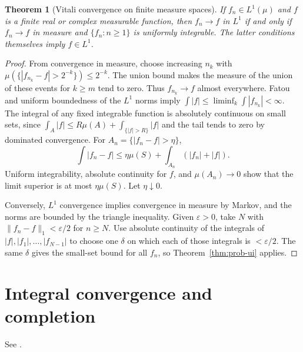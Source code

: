 \documentclass[11pt,oneside,openany]{book}
\theoremstyle{plain}
\newtheorem{theorem}{Theorem}[chapter]
\theoremstyle{definition}
\theoremstyle{remark}
\begin{document}
\begin{theorem}[Vitali convergence on finite measure spaces]
\label{thm:prob-vitali}
If \(f_n\in L^1(\mu)\) and \(f\) is a finite real or complex
measurable function, then \(f_n\to f\) in \(L^1\) if and only if
\(f_n\to f\) in measure and \(\{f_n:n\ge1\}\) is uniformly
integrable. The latter conditions themselves imply \(f\in L^1\).
\end{theorem}
\begin{proof}
From convergence in measure, choose increasing \(n_k\) with
\(\mu(\{|f_{n_k}-f|>2^{-k}\})\le2^{-k}\). The union bound makes the
measure of the union of these events for \(k\ge m\) tend to zero.
Thus \(f_{n_k}\to f\) almost everywhere. Fatou and uniform boundedness
of the \(L^1\) norms imply \(\int |f|\le\liminf_k\int|f_{n_k}|<\infty\).
The integral of any fixed integrable function is absolutely continuous
on small sets, since
\(\int_A |f|\le R\mu(A)+\int_{\{|f|>R\}}|f|\) and the tail tends to
zero by dominated convergence. For \(A_n=\{|f_n-f|>\eta\}\),
\[
 \int |f_n-f|\le \eta\mu(S)+\int_{A_n}(|f_n|+|f|).
\]
Uniform integrability, absolute continuity for \(f\), and
\(\mu(A_n)\to0\) show that the limit superior is at most \(\eta\mu(S)\).
Let \(\eta\downarrow0\).

Conversely, \(L^1\) convergence implies convergence in measure by
Markov, and the norms are bounded by the triangle inequality. Given
\(\varepsilon>0\), take \(N\) with \(\|f_n-f\|_1<\varepsilon/2\)
for \(n\ge N\). Use absolute continuity of the integrals of
\(|f|,|f_1|,\ldots,|f_{N-1}|\) to choose one \(\delta\) on which
each of those integrals is \(<\varepsilon/2\). The same \(\delta\)
gives the small-set bound for all \(f_n\), so
Theorem~\ref{thm:prob-ui} applies.
\end{proof}

\section{Integral convergence and completion}
\label{p01-06}

See \cite[results 1.21--1.23 and 1.27--1.29]{Kallenberg}.
\end{document}
